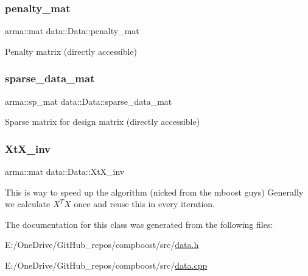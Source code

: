 \subsubsection{\texorpdfstring{penalty\+\_\+mat}{penalty\_mat}}
{\footnotesize\ttfamily arma\+::mat data\+::\+Data\+::penalty\+\_\+mat}



Penalty matrix (directly accessible) 

\mbox{\label{classdata_1_1_data_abc5c5380b4aa8120cdda74195b90955f}} 
\subsubsection{\texorpdfstring{sparse\+\_\+data\+\_\+mat}{sparse\_data\_mat}}
{\footnotesize\ttfamily arma\+::sp\+\_\+mat data\+::\+Data\+::sparse\+\_\+data\+\_\+mat}



Sparse matrix for design matrix (directly accessible) 

\mbox{\label{classdata_1_1_data_a31bdf7564f8589487a0ee9952ebef0c0}} 
\subsubsection{\texorpdfstring{Xt\+X\+\_\+inv}{XtX\_inv}}
{\footnotesize\ttfamily arma\+::mat data\+::\+Data\+::\+Xt\+X\+\_\+inv}

This is way to speed up the algorithm (nicked from the mboost guys) Generally we calculate $X^T X$ once and reuse this in every iteration. 

The documentation for this class was generated from the following files\+:\begin{DoxyCompactItemize}
\item 
E\+:/\+One\+Drive/\+Git\+Hub\+\_\+repos/compboost/src/\mbox{\hyperlink{data_8h}{data.\+h}}\item 
E\+:/\+One\+Drive/\+Git\+Hub\+\_\+repos/compboost/src/\mbox{\hyperlink{data_8cpp}{data.\+cpp}}\end{DoxyCompactItemize}
